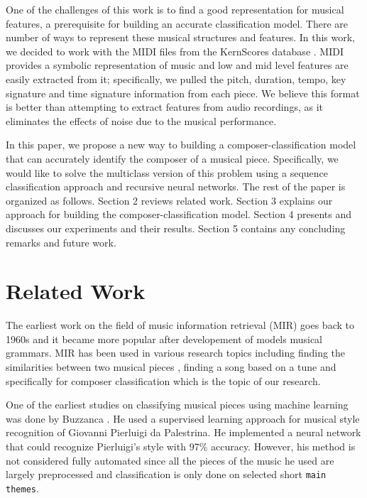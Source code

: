 \documentclass[11pt,a4paper]{article}
\begin{document}
One of the challenges of this work is to find a good representation for musical features, a prerequisite for building an accurate classification model. There are number of ways to represent these musical structures and features.  In this work, we decided to work with the MIDI files from the KernScores database \cite{Kern}. MIDI provides a symbolic representation of music and low and mid level features are easily extracted from it; specifically, we pulled the pitch, duration, tempo, key signature and time signature information from each piece. We believe this format is better than attempting to extract features from audio recordings, as it eliminates the effects of noise due to the musical performance.

In this paper, we propose a new way to building a composer-classification model that can accurately identify the composer of a musical piece. Specifically, we would like to solve the multiclass version of this problem using a sequence classification approach and recursive neural networks. The rest of the paper is organized as follows. Section 2 reviews related work. Section 3 explains our approach for building the composer-classification model. Section 4 presents and discusses our experiments and their results. Section 5 contains any concluding remarks and future work.


\section{Related Work}

The earliest work on the field of music information retrieval (MIR) goes back to 1960s \cite {Kassler} and it became more popular after developement of models musical grammars. MIR has been used in various research topics including finding the similarities between two musical pieces \cite{Berenzweig}, finding a song based on a tune \cite {Ghias} and specifically for composer classification which is the topic of our research.

One of the earliest studies on classifying musical pieces using machine learning was done by Buzzanca \cite{Buzz}. He used a supervised learning approach for musical style recognition of Giovanni Pierluigi da Palestrina. He implemented a neural network that could recognize Pierluigi's style with 97\% accuracy. However, his method is not considered fully automated since all the pieces of the music he used are largely preprocessed and classification is only done on selected short \texttt {main themes}.
\end{document}
